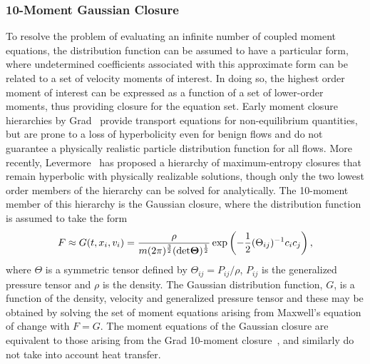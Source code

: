 \documentclass[titlepage,11pt,letterpaper]{article}
\begin{document}
\subsubsection{10-Moment Gaussian Closure}
To resolve the problem of evaluating an infinite number of coupled moment equations, the 
distribution function can be assumed to have a particular form, where undetermined 
coefficients associated with this approximate form can be related to a set of velocity 
moments of interest. In doing so, the highest order moment of interest can be expressed 
as a function of a set of lower-order moments, thus providing closure for the equation set. 
Early moment closure hierarchies by Grad~\cite{grad:1949} provide transport equations for 
non-equilibrium quantities, but are prone to a loss of hyperbolicity even for benign flows 
and do not guarantee a physically realistic particle distribution function for all flows. 
More recently, Levermore~\cite{levermore:1996a} has proposed a hierarchy of maximum-entropy 
closures that remain hyperbolic with physically realizable solutions, though only the two 
lowest order members of the hierarchy can be solved for analytically. The 10-moment member 
of this hierarchy is the Gaussian closure, where the distribution function is assumed to take 
the form
%
\begin{equation}\label{eq:gauss_func}
F\approx G(t,x_i,v_i)=\frac{\rho}{m(2\pi)^\frac{3}{2}(\rm{det} 
\mathbf{\Theta})^\frac{1}{2}}\exp \left(-\frac{1}{2}(\Theta_{ij})^{-1}c_{i}c_{j} 
\right),
\end{equation}
%
where $\Theta$ is a symmetric tensor defined by $\Theta_{ij} = P_{ij} / \rho$, $P_{ij}$ is the 
generalized pressure tensor and $\rho$ is the density. The Gaussian distribution function, 
$G$, is a function of the density, velocity and generalized pressure tensor and these may be 
obtained by solving the set of moment equations arising from Maxwell's equation of change 
with $F = G$. The moment equations of the Gaussian closure are equivalent to those arising 
from the Grad 10-moment closure~\cite{grad:1949}, and similarly do not take into account 
heat transfer. 


\end{document}

